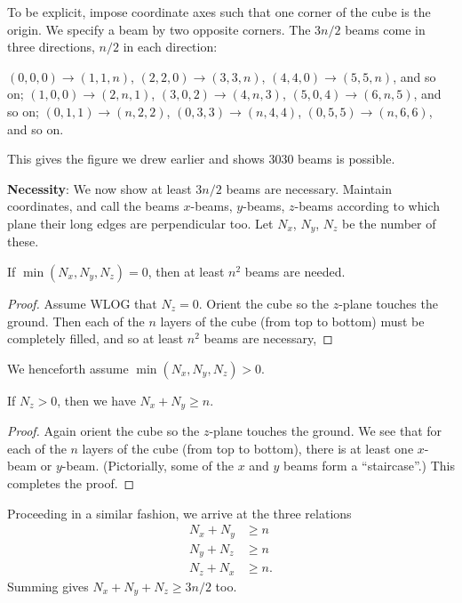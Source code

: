 \documentclass[11pt]{scrartcl}
\begin{document}
To be explicit,
impose coordinate axes such that one corner of the cube is the origin.
We specify a beam by two opposite corners.
The $3n/2$ beams come in three directions, $n/2$ in each direction:
\begin{itemize}
  \ii $(0,0,0) \to (1,1,n)$, $(2,2,0) \to (3,3,n)$, $(4,4,0) \to (5,5,n)$, and so on;
  \ii $(1,0,0) \to (2,n,1)$, $(3,0,2) \to (4,n,3)$, $(5,0,4) \to (6,n,5)$, and so on;
  \ii $(0,1,1) \to (n,2,2)$, $(0,3,3) \to (n,4,4)$, $(0,5,5) \to (n,6,6)$, and so on.
\end{itemize}
This gives the figure we drew earlier and shows $3030$ beams is possible.

\bigskip

\textbf{Necessity}:
We now show at least $3n/2$ beams are necessary.
Maintain coordinates,
and call the beams $x$-beams, $y$-beams, $z$-beams
according to which plane their long edges are perpendicular too.
Let $N_x$, $N_y$, $N_z$ be the number of these.

\begin{claim*}
  If $\min(N_x, N_y, N_z) = 0$, then at least $n^2$ beams are needed.
\end{claim*}
\begin{proof}
  Assume WLOG that $N_z = 0$.
  Orient the cube so the $z$-plane touches the ground.
  Then each of the $n$ layers of the cube (from top to bottom)
  must be completely filled, and so at least $n^2$ beams are necessary,
\end{proof}

We henceforth assume $\min(N_x, N_y, N_z) > 0$.

\begin{claim*}
  If $N_z > 0$, then we have $N_x + N_y \ge n$.
\end{claim*}
\begin{proof}
  Again orient the cube so the $z$-plane touches the ground.
  We see that for each of the $n$ layers of the cube (from top to bottom),
  there is at least one $x$-beam or $y$-beam.
  (Pictorially, some of the $x$ and $y$ beams form a ``staircase''.)
  This completes the proof.
\end{proof}
Proceeding in a similar fashion, we arrive at the three relations
\begin{align*}
  N_x + N_y &\ge n \\
  N_y + N_z &\ge n \\
  N_z + N_x &\ge n.
\end{align*}
Summing gives $N_x  + N_y + N_z \ge 3n/2$ too.
\end{document}
